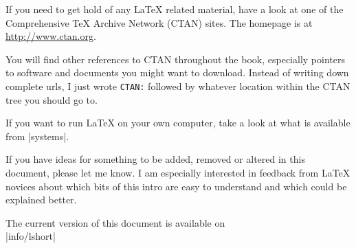 \bigskip
\noindent If you need to get hold of any \LaTeX{} related material, 
have a look at one of the Comprehensive \TeX{} Archive Network
(CTAN) sites. The homepage is at
\url{http://www.ctan.org}.

You will find other references to CTAN throughout the book, especially
pointers to software and documents you might want to download. Instead
of writing down complete urls, I just wrote \texttt{CTAN:} followed by
whatever location within the CTAN tree you should go to.

If you want to run \LaTeX{} on your own computer, take a look at what
is available from \CTAN|systems|.

\noindent If you have ideas for something to be
added, removed or altered in this document, please let me know. I am
especially interested in feedback from \LaTeX{} novices about which
bits of this intro are easy to understand and which could be explained
better.

\bigskip
\begin{verse}
%
\end{verse}
\noindent The current version of this document is available on\\
\CTAN|info/lshort|

\endinput



%

